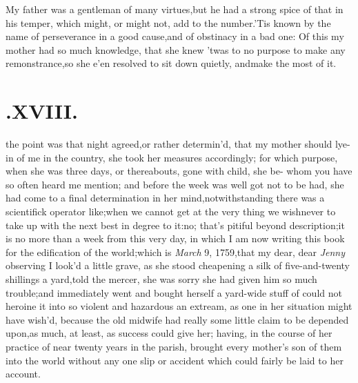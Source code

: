 \documentclass{article}
\begin{document}
My father was a gentleman of many virtues,\tsk  but he had a
strong spice of that in his temper, which might, or might not, add
to the number.\tsk  ’Tis known by the name of perseverance
in a good cause,\tsk  and of obstinacy in a bad one: Of this my
mother had so much know\-ledge, that she knew ’twas to no
purpose to make any remonstrance,\tsk  so she e’en resolved
to sit down quietly, and\break make the most of it.

\section{.\enspace XVIII.}

 the point was that night agreed,\break or rather
determin’d, that my mo\-ther should lye-in of me in the country, she
took her measures accordingly; for which purpose, when she was
three days, or thereabouts, gone with child, she be-
whom you have so often heard me mention; and
before the week was well got 
not to be had, she had come to a final
determination in her mind,\tsh  notwith\-standing there was a scientifick \hbox{operator} 
like;\tsh  when we cannot get at the very thing we
wish\tsh  never to take up with the next best in degree to
it:\tsk  no; that’s pitiful beyond description;\tsk  it is
no more than a week from this very day, in which I am now writing
this book for the edification of the world;\tsk  which is
\textit{March} 9, 1759,\tsh  that my dear, dear \textit{Jenny}
observing I look’d a little grave, as she stood cheapening a silk
of five-and-twenty shillings a yard,\tsk  told the mercer, she was sorry she had given him so
much trouble;\tsk  and immediately went and bought herself a
yard-wide stuff of 
could not heroine it into so violent and hazardous an
extream, as one in her situation might have wish’d, because the
old midwife had really some little claim to be depended upon,\tsk  as
much, at least, as success could give her; having, in the course of
her practice of near twenty years in the parish, brought every
mother’s son of them into the world without any one slip or
accident which could fairly be laid to her account.
\end{document}
